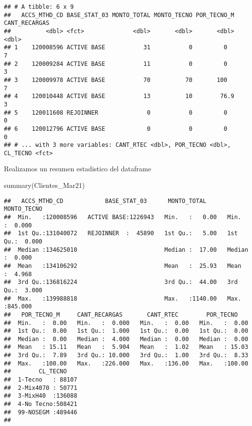 \documentclass[
]{article}
\newenvironment{Shaded}{\begin{snugshade}}{\end{snugshade}}
\newcommand{\FunctionTok}[1]{\textcolor[rgb]{0.00,0.00,0.00}{#1}}
\newcommand{\NormalTok}[1]{#1}
\begin{document}
\begin{verbatim}
## # A tibble: 6 x 9
##   ACCS_MTHD_CD BASE_STAT_03 MONTO_TOTAL MONTO_TECNO POR_TECNO_M CANT_RECARGAS
##          <dbl> <fct>              <dbl>       <dbl>       <dbl>         <dbl>
## 1    120008596 ACTIVE BASE           31           0         0               7
## 2    120009284 ACTIVE BASE           11           0         0               3
## 3    120009978 ACTIVE BASE           70          70       100               7
## 4    120010448 ACTIVE BASE           13          10        76.9             3
## 5    120011608 REJOINNER              0           0         0               0
## 6    120012796 ACTIVE BASE            0           0         0               0
## # ... with 3 more variables: CANT_RTEC <dbl>, POR_TECNO <dbl>, CL_TECNO <fct>
\end{verbatim}

Realizamos un resumen estadistico del dataframe

\begin{Shaded}
\begin{Highlighting}[]
\FunctionTok{summary}\NormalTok{(Clientes\_Mar21)}
\end{Highlighting}
\end{Shaded}

\begin{verbatim}
##   ACCS_MTHD_CD            BASE_STAT_03      MONTO_TOTAL       MONTO_TECNO     
##  Min.   :120008596   ACTIVE BASE:1226943   Min.   :   0.00   Min.   :  0.000  
##  1st Qu.:131040072   REJOINNER  :  45890   1st Qu.:   5.00   1st Qu.:  0.000  
##  Median :134625010                         Median :  17.00   Median :  0.000  
##  Mean   :134106292                         Mean   :  25.93   Mean   :  4.968  
##  3rd Qu.:136816224                         3rd Qu.:  44.00   3rd Qu.:  3.000  
##  Max.   :139988818                         Max.   :1140.00   Max.   :845.000  
##   POR_TECNO_M     CANT_RECARGAS       CANT_RTEC        POR_TECNO     
##  Min.   :  0.00   Min.   :  0.000   Min.   :  0.00   Min.   :  0.00  
##  1st Qu.:  0.00   1st Qu.:  1.000   1st Qu.:  0.00   1st Qu.:  0.00  
##  Median :  0.00   Median :  4.000   Median :  0.00   Median :  0.00  
##  Mean   : 15.11   Mean   :  5.904   Mean   :  1.02   Mean   : 15.03  
##  3rd Qu.:  7.89   3rd Qu.: 10.000   3rd Qu.:  1.00   3rd Qu.:  8.33  
##  Max.   :100.00   Max.   :226.000   Max.   :136.00   Max.   :100.00  
##        CL_TECNO     
##  1-Tecno   : 88107  
##  2-Mix4070 : 50771  
##  3-MixH40  :136088  
##  4-No Tecno:508421  
##  99-NOSEGM :489446  
## 
\end{verbatim}
\end{document}
